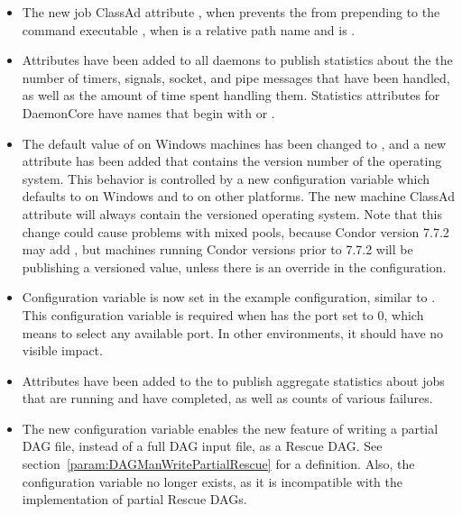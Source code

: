 \begin{itemize}

\item The new job ClassAd attribute , 
when  prevents the  from 
prepending  to the command executable ,
when  is a relative path name and  
is .

\item Attributes have been added to all daemons to publish statistics 
about the the number of timers, signals, socket, and pipe messages 
that have been handled, as well as the amount of time spent handling them.	Statistics attributes for DaemonCore
have names that begin with  or .

\item The default value of  on Windows machines has been changed
to , and a new attribute  has been added 
that contains the version number of the operating system.  
This behavior is controlled by a new configuration variable
 which defaults to  on Windows 
and to  on other platforms.  
The new machine ClassAd attribute  will always contain 
the versioned operating system.  
Note that this change could cause problems with mixed pools,
because Condor version 7.7.2  may add , 
but machines running Condor versions prior to 7.7.2 will be publishing 
a versioned  value,
unless there is an override in the configuration.

\item Configuration variable  is now set 
in the example configuration,
similar to .
This configuration variable is required when  
has the port set to 0, which means to select any available port.
In other environments, it should have no visible impact.

\item Attributes have been added to the  
to publish aggregate statistics
about jobs that are running and have completed, as well as counts of various
failures. 

\item The new configuration variable 
enables the new feature of writing a partial DAG file, instead of a full
DAG input file, as a Rescue DAG.  
See section~\ref{param:DAGManWritePartialRescue} for a definition.
Also, the configuration variable
 no longer exists,
as it is incompatible with the implementation of partial Rescue DAGs.

\end{itemize}

